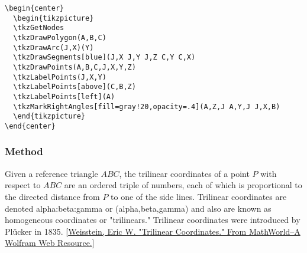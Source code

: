 \begin{minipage}{.5\textwidth}
\begin{Verbatim}
\begin{center}
  \begin{tikzpicture}
  \tkzGetNodes
  \tkzDrawPolygon(A,B,C)
  \tkzDrawArc(J,X)(Y)
  \tkzDrawSegments[blue](J,X J,Y J,Z C,Y C,X)
  \tkzDrawPoints(A,B,C,J,X,Y,Z)
  \tkzLabelPoints(J,X,Y)
  \tkzLabelPoints[above](C,B,Z)
  \tkzLabelPoints[left](A)
  \tkzMarkRightAngles[fill=gray!20,opacity=.4](A,Z,J A,Y,J J,X,B)
  \end{tikzpicture}
\end{center}
\end{Verbatim}
\end{minipage}


\subsubsection{Method } %
\label{ssub:method_imeth_triangle_trilinear}

Given a reference triangle $ABC$, the trilinear coordinates of a point $P$ with respect to $ABC$ are an ordered triple of numbers, each of which is proportional to the directed distance from $P$ to one of the side lines. Trilinear coordinates are denoted alpha:beta:gamma or (alpha,beta,gamma) and also are known as homogeneous coordinates or "trilinears." Trilinear coordinates were introduced by Plücker in 1835.
[\href{https://mathworld.wolfram.com/TrilinearCoordinates.html}{Weisstein, Eric W. "Trilinear Coordinates." From MathWorld--A Wolfram Web Resource.}]

